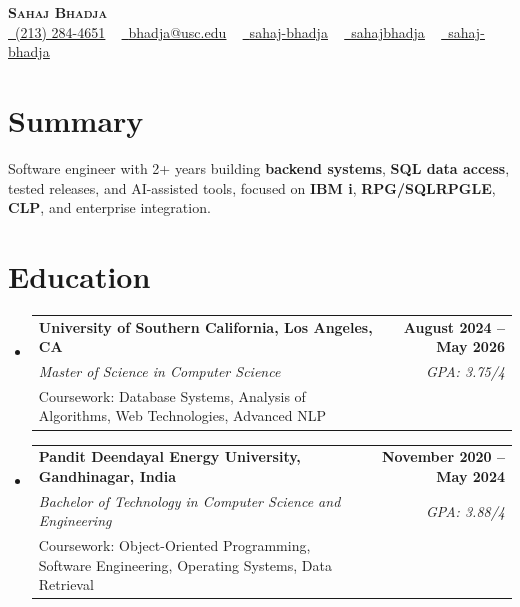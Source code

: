 \documentclass[letterpaper,10pt]{article}
\makeatletter
\newcommand{\sectionGap}{\vspace{-8pt}}
\newcommand{\resumeEduSubheading}[5]{\vspace{-1pt}\item\begin{tabular*}{1.0\textwidth}[t]{l@{\extracolsep{\fill}}r}\textbf{#1} & \textbf{\small #2} \\\textit{\small #3} & \textit{\small #4} \\\small #5 & \\\end{tabular*}\vspace{-4pt}}
\newcommand{\resumeSubHeadingListStart}{\begin{itemize}[leftmargin=0.0in, label={}]}
\newcommand{\resumeSubHeadingListEnd}{\end{itemize}}
\makeatother
\begin{document}
\begin{center}
{\Huge \scshape \textbf{Sahaj Bhadja}} \\ \vspace{1pt}
\small \href{tel:2132844651}{\faPhone\ \underline{(213) 284-4651}} ~ \href{mailto:bhadja@usc.edu}{\raisebox{-0.2\height}\faEnvelope\ \underline{bhadja@usc.edu}} ~
\href{https://www.linkedin.com/in/sahaj-bhadja/}{\raisebox{-0.2\height}\faLinkedin\ \underline{sahaj-bhadja}} ~ \href{https://github.com/SAHAJ-BHADJA}{\raisebox{-0.2\height}\faGithub\ \underline{sahajbhadja}} ~
\href{https://sahaj-bhadja.vercel.app/}{\raisebox{-0.2\height}\faGlobe\ \underline{sahaj-bhadja}}
\end{center}
\vspace{-16pt}
\section{Summary}
\begin{itemize}[leftmargin=0.15in, label={}]
\small{\item{Software engineer with 2+ years building \textbf{backend systems}, \textbf{SQL data access}, tested releases, and AI-assisted tools, focused on \textbf{IBM i}, \textbf{RPG/SQLRPGLE}, \textbf{CLP}, and enterprise integration.}}
\end{itemize}
\sectionGap
\section{Education}
\resumeSubHeadingListStart
\resumeEduSubheading{University of Southern California, Los Angeles, CA}{August 2024 -- May 2026}{Master of Science in Computer Science}{GPA: 3.75/4}{Coursework: Database Systems, Analysis of Algorithms, Web Technologies, Advanced NLP}
\resumeEduSubheading{Pandit Deendayal Energy University, Gandhinagar, India}{November 2020 -- May 2024}{Bachelor of Technology in Computer Science and Engineering}{GPA: 3.88/4}{Coursework: Object-Oriented Programming, Software Engineering, Operating Systems, Data Retrieval}
\resumeSubHeadingListEnd
\sectionGap
\end{document}
